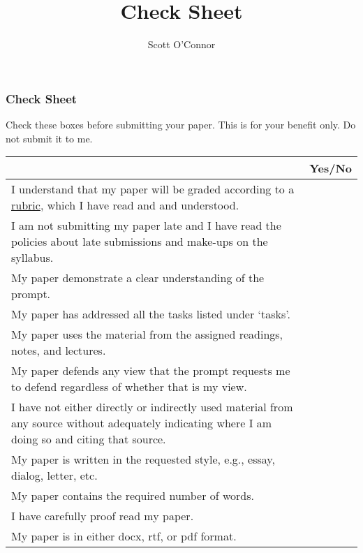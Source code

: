 \documentclass[]{article}
\title{Check Sheet}
\author{Scott O’Connor}
\begin{document}
\maketitle

\subsubsection{Check Sheet}\label{check-sheet}

Check these boxes before submitting your paper. This is for your benefit
only. Do not submit it to me.

\begin{longtable}[c]{@{}lc@{}}
\toprule
& Yes/No\tabularnewline
\midrule
\endhead
I understand that my paper will be graded according to a
\href{/Teaching/Grading/LongRubric.pdf}{rubric}, which I have read and
and understood. &\tabularnewline
I am not submitting my paper late and I have read the policies about
late submissions and make-ups on the syllabus. &\tabularnewline
My paper demonstrate a clear understanding of the prompt.
&\tabularnewline
My paper has addressed all the tasks listed under `tasks'.
&\tabularnewline
My paper uses the material from the assigned readings, notes, and
lectures. &\tabularnewline
My paper defends any view that the prompt requests me to defend
regardless of whether that is my view. &\tabularnewline
I have not either directly or indirectly used material from any source
without adequately indicating where I am doing so and citing that
source. &\tabularnewline
My paper is written in the requested style, e.g., essay, dialog, letter,
etc. &\tabularnewline
My paper contains the required number of words. &\tabularnewline
I have carefully proof read my paper. &\tabularnewline
My paper is in either docx, rtf, or pdf format. &\tabularnewline
\bottomrule
\end{longtable}
\end{document}
